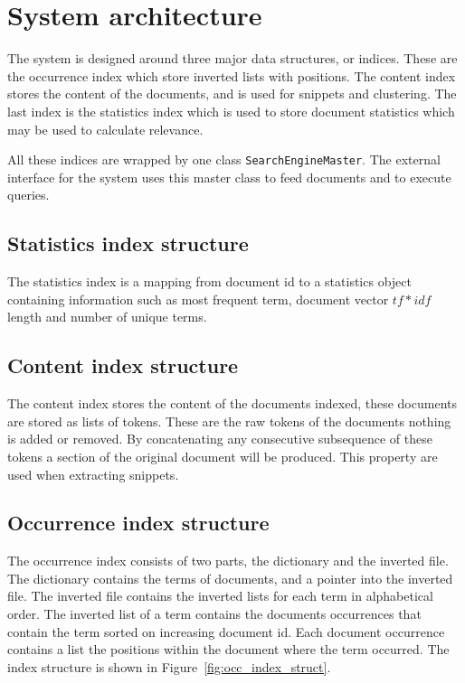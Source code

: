 \section{System architecture}
\label{sec:architecture}
\thispagestyle{fancy}
The system is designed around three major data structures, or indices. These are the occurrence index which store inverted lists with positions. The content index stores the content of the documents, and is used for snippets and clustering. The last index is the statistics index which is used to store document statistics which may be used to calculate relevance. 

All these indices are wrapped by one class \texttt{SearchEngineMaster}. The external interface for the system uses this master class to feed documents and to execute queries.  

\subsection{Statistics index structure}\label{sub:statistics_index_structure}
The statistics index is a mapping from document id to a statistics object containing information such as most frequent term, document vector $tf*idf$ length and number of unique terms.

\subsection{Content index structure}\label{sub:content_index_structure}
The content index stores the content of the documents indexed, these documents are stored as lists of tokens. These are the raw tokens of the documents nothing is added or removed. By concatenating any consecutive subsequence of these tokens a section of the original document will be produced. This property are used when extracting snippets.  

\subsection{Occurrence index structure}\label{sub:occurrence_index_structure}
The occurrence index consists of two parts, the dictionary and the inverted file. The dictionary contains the terms of documents, and a pointer into the inverted file. The inverted file contains the inverted lists for each term in alphabetical order. The inverted list of a term contains the documents occurrences that contain the term sorted on increasing document id. Each document occurrence contains a list the positions within the document where the term occurred. The index structure is shown in Figure~\ref{fig:occ_index_struct}.

